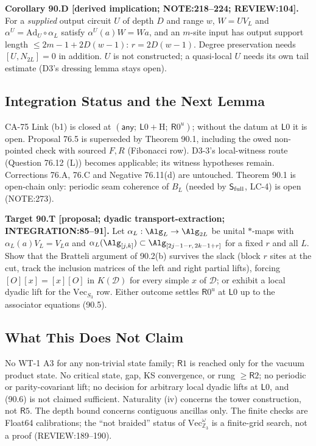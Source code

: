 \textbf{Corollary 90.D [derived implication; NOTE:218--224; REVIEW:104].}  For a \emph{supplied} output circuit \(U\) of
depth \(D\) and range \(w\), \(W=UV_L\) and \(\alpha^U=\mathrm{Ad}_U\circ\alpha_L\) satisfy \(\alpha^U(a)W=Wa\), and an \(m\)-site
input has output support length \(\le2m-1+2D(w-1)\): \(r=2D(w-1)\).  Degree preservation needs \([U,N_{2L}]=0\) in addition.
\(U\) is not constructed; a quasi-local \(U\) needs its own tail estimate (D3's dressing lemma stays open).

\subsection{Integration Status and the Next Lemma}

CA-75 Link (b1) is closed at \((\mathsf{any};\ \mathsf L0+\text{H};\ \mathsf R0^u)\); without the datum at \(\mathsf L0\) it is
open.  Proposal 76.5 is superseded by Theorem 90.1, including the owed non-pointed check with sourced \(F,R\)
(Fibonacci row).  D3-3's local-witness route (Question 76.12 (L)) becomes applicable; its witness hypotheses remain.
Corrections 76.A, 76.C and Negative 76.11(d) are untouched.  Theorem 90.1 is open-chain only: periodic seam coherence of
\(B_L\) (needed by \(\mathsf S_{\rm full}\), LC-4) is open (NOTE:273).

\textbf{Target 90.T [proposal; dyadic transport-extraction; INTEGRATION:85--91].}  Let \(\alpha_L:\Alg_L\to\Alg_{2L}\) be
unital \(*\)-maps with \(\alpha_L(a)V_L=V_La\) and \(\alpha_L(\Alg_{[j,k]})\subset\Alg_{[2j-1-r,\,2k-1+r]}\) for a fixed \(r\) and
all \(L\).  Show that the Bratteli argument of 90.2(b) survives the slack (block \(r\) sites at the cut, track the inclusion
matrices of the left and right partial lifts), forcing \([O][x]=[x][O]\) in \(K(\mathcal D)\) for every simple \(x\) of
\(\mathcal D\); or exhibit a local dyadic lift for the \(\mathrm{Vec}_{S_3}\) row.  Either outcome settles \(\mathsf R0^u\) at
\(\mathsf L0\) up to the associator equations (90.5).

\subsection{What This Does Not Claim}

No WT-1 A3 for any non-trivial state family; \(\mathsf R1\) is reached only for the vacuum product state.  No critical
state, gap, KS convergence, or rung \(\ge\mathsf R2\); no periodic or parity-covariant lift; no decision for arbitrary local
dyadic lifts at \(\mathsf L0\), and (90.6) is not claimed sufficient.  Naturality (iv) concerns the tower construction, not
\(\mathsf R5\).  The depth bound concerns contiguous ancillas only.  The finite checks are Float64 calibrations; the
``not braided'' status of \(\mathrm{Vec}_{\mathbb Z_3}^\omega\) is a finite-grid search, not a proof (REVIEW:189--190).

